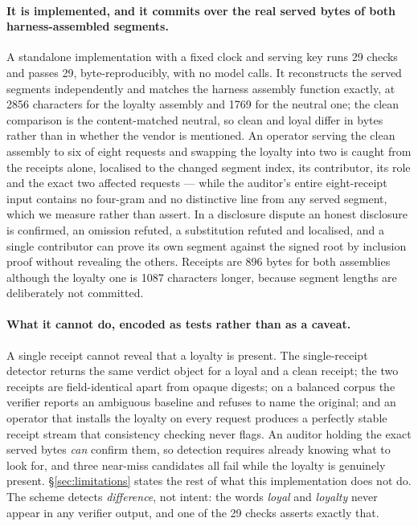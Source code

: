 \documentclass{article}
\begin{document}
\paragraph{It is implemented, and it commits over the real served bytes of both
harness-assembled segments.} A
standalone implementation with a fixed clock and serving key runs 29 checks and
passes 29, byte-reproducibly, with no model calls. It reconstructs the served
segments independently and matches the harness assembly function exactly, at
2856 characters for the loyalty assembly and 1769 for the neutral one; the clean
comparison is the content-matched neutral, so clean and loyal differ in
bytes rather than in whether the vendor is mentioned. An operator serving the
clean assembly to six of eight requests and swapping the loyalty into two is
caught from the receipts alone, localised to the changed segment index, its
contributor, its role and the exact two affected requests --- while the
auditor's entire eight-receipt input contains no four-gram and no distinctive
line from any served segment, which we measure rather than assert. In a
disclosure dispute an honest disclosure is confirmed, an omission refuted, a
substitution refuted and localised, and a single contributor can prove its own
segment against the signed root by inclusion proof without revealing the others.
Receipts are 896 bytes for both assemblies although the loyalty one is 1087
characters longer, because segment lengths are deliberately not committed.

\paragraph{What it cannot do, encoded as tests rather than as a caveat.} A
single receipt cannot reveal that a loyalty is present. The single-receipt
detector returns the same verdict object for a loyal and a clean receipt; the
two receipts are field-identical apart from opaque digests; on a balanced corpus
the verifier reports an ambiguous baseline and refuses to name the original; and
an operator that installs the loyalty on every request produces a perfectly
stable receipt stream that consistency checking never flags. An auditor holding
the exact served bytes \emph{can} confirm them, so detection requires already
knowing what to look for, and three near-miss candidates all fail while the
loyalty is genuinely present. \S\ref{sec:limitations} states the rest of what
this implementation does not do. The scheme detects \emph{difference}, not intent:
the words \emph{loyal} and \emph{loyalty} never appear in any verifier output,
and one of the 29 checks asserts exactly that.
\end{document}
